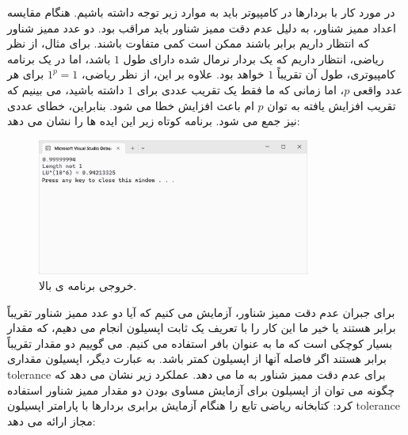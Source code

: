 {
    \Large
    \begin{spacing}{1.5}
        در مورد کار با بردارها در کامپیوتر باید به موارد زیر توجه داشته باشیم.
        هنگام مقایسه اعداد ممیز شناور، به دلیل عدم دقت ممیز شناور باید مراقب بود.
        دو عدد ممیز شناور که انتظار داریم برابر باشند ممکن است کمی متفاوت باشند.
        برای مثال، از نظر ریاضی، انتظار داریم که یک بردار نرمال شده دارای طول $1$ باشد، اما در یک برنامه کامپیوتری، طول آن تقریباً $1$ خواهد بود.
        علاوه بر این، از نظر ریاضی، $1^p=1$ برای هر عدد واقعی $p$، اما زمانی که ما فقط یک تقریب عددی برای $1$ داشته باشید، می بینیم که تقریب افزایش یافته به توان $p$ ام باعث افزایش خطا می شود.
        بنابراین، خطای عددی نیز جمع می شود. برنامه کوتاه زیر این ایده ها را نشان می دهد:
        \textbf{\vspace{6pt}}
        \lr{}
        \textbf{\vspace{-30pt}}
        \begin{figure}[H]
            \centering
            \setlength{\belowcaptionskip}{-10pt}
            \includegraphics[width=0.8\textwidth]{Images/4/4.Session.1.1.20}
            \caption {خروجی برنامه ی بالا.}
            \label{fig:4.Session.1.1.20}
        \end{figure}

        برای جبران عدم دقت ممیز شناور، آزمایش می کنیم که آیا دو عدد ممیز شناور تقریباً برابر هستند یا خیر
        ما این کار را با تعریف یک ثابت اپسیلون انجام می دهیم، که مقدار بسیار کوچکی است که ما به عنوان بافر استفاده می کنیم.
        می گوییم دو مقدار تقریباً برابر هستند اگر فاصله آنها از اپسیلون کمتر باشد.
        به عبارت دیگر، اپسیلون مقداری tolerance برای عدم دقت ممیز شناور به ما می دهد.
        عملکرد زیر نشان می دهد که چگونه می توان از اپسیلون برای آزمایش مساوی بودن دو مقدار ممیز شناور استفاده کرد:
        \textbf{\vspace{6pt}}
        \lr{}
        \textbf{\vspace{6pt}}
        کتابخانه ریاضی  تابع  را هنگام آزمایش برابری بردارها با پارامتر اپسیلون tolerance مجاز ارائه می دهد:
        \textbf{\vspace{6pt}}
        \lr{}
    \end{spacing}
}

